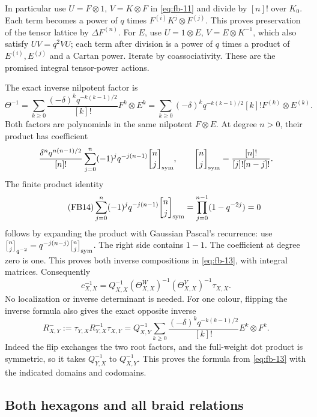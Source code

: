In particular use \(U=F\otimes1\), \(V=K\otimes F\) in \eqref{eq:fb-11} and
divide by \([n]!\) over \(K_0\). Each term becomes a power of \(q\)
times \(F^{(i)}K^j\otimes F^{(j)}\). This proves preservation of the
tensor lattice by \(\Delta F^{(n)}\). For \(E\), use
\(U=1\otimes E\), \(V=E\otimes K^{-1}\), which also satisfy
\(UV=q^2VU\); each term after division is a power of \(q\) times a
product of \(E^{(i)},E^{(j)}\) and a Cartan power. Iterate by
coassociativity. These are the promised integral tensor-power actions.

The exact inverse nilpotent factor is
\begin{equation}\tag{FB13}\label{eq:fb-13}
\Theta^{-1}=\sum_{k\ge0}
 \frac{(-\delta)^k q^{-k(k-1)/2}}{[k]!}F^k\otimes E^k
 =\sum_{k\ge0}(-\delta)^k q^{-k(k-1)/2}[k]!
 F^{(k)}\otimes E^{(k)}.
\end{equation}
Both factors are polynomials in the same nilpotent \(F\otimes E\).
At degree \(n>0\), their product has coefficient
\[
 \frac{\delta^n q^{n(n-1)/2}}{[n]!}
 \sum_{j=0}^{n}(-1)^j q^{-j(n-1)}
 {n\brack j}_{\rm sym},
 \qquad {n\brack j}_{\rm sym}=\frac{[n]!}{[j]![n-j]!}.
\]
The finite product identity
\begin{equation}\tag{FB14}\label{eq:fb-14}
\sum_{j=0}^{n}(-1)^j q^{-j(n-1)}{n\brack j}_{\rm sym}
 =\prod_{j=0}^{n-1}(1-q^{-2j})=0
\end{equation}
follows by expanding the product with Gaussian Pascal's recurrence:
use \({n\brack j}_{q^{-2}}=q^{-j(n-j)}{n\brack j}_{\rm sym}\).
The right side contains \(1-1\). The coefficient at degree zero is one.
This proves both inverse compositions in \eqref{eq:fb-13}, with integral matrices.
Consequently
\begin{equation}\tag{FB15}\label{eq:fb-15}
c_{X,X}^{-1}=Q_{X,X}^{-1}(\Theta^W_{X,X})^{-1}
 (\Theta^V_{X,X})^{-1}\tau_{X,X}.
\end{equation}
No localization or inverse determinant is needed.
For one colour, flipping the inverse formula also gives the exact
opposite inverse
\[
 R^-_{X,Y}:=\tau_{Y,X}R_{Y,X}^{-1}\tau_{X,Y}
 =Q_{X,Y}^{-1}\sum_{k\ge0}
 \frac{(-\delta)^kq^{-k(k-1)/2}}{[k]!}E^k\otimes F^k.
\]
Indeed the flip exchanges the two root factors, and the full-weight
dot product is symmetric, so it takes \(Q_{Y,X}^{-1}\) to
\(Q_{X,Y}^{-1}\). This proves the formula from
\eqref{eq:fb-13} with the indicated domains and codomains.

\subsection{Both hexagons and all braid relations}
\label{sec:fb-hexagons}

